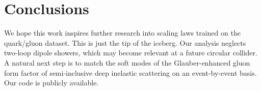 \section{Conclusions}\label{sec:conclusions}

We hope this work inspires further research into scaling laws trained on
the quark/gluon dataset. This is just the tip of the iceberg. Our
analysis neglects two-loop dipole showers, which may become relevant at
a future circular collider. A natural next step is to match the soft
modes of the Glauber-enhanced gluon form factor of semi-inclusive deep
inelastic scattering on an event-by-event basis. Our code is publicly
available.

